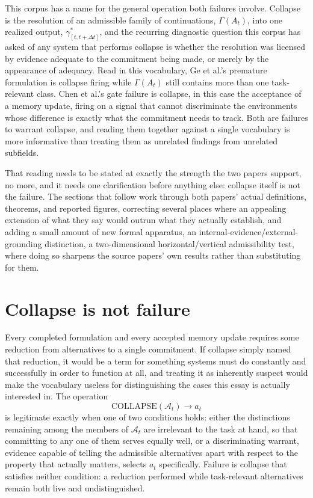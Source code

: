 \documentclass[11pt]{article}
\begin{document}
This corpus has a name for the general operation both failures involve. Collapse is the resolution of an admissible family of continuations, $\Gamma(A_t)$, into one realized output, $\gamma^*_{[t,t+\Delta t]}$, and the recurring diagnostic question this corpus has asked of any system that performs collapse is whether the resolution was licensed by evidence adequate to the commitment being made, or merely by the appearance of adequacy. Read in this vocabulary, Ge et al.'s premature formulation is collapse firing while $\Gamma(A_t)$ still contains more than one task-relevant class. Chen et al.'s gate failure is collapse, in this case the acceptance of a memory update, firing on a signal that cannot discriminate the environments whose difference is exactly what the commitment needs to track. Both are failures to warrant collapse, and reading them together against a single vocabulary is more informative than treating them as unrelated findings from unrelated subfields.

That reading needs to be stated at exactly the strength the two papers support, no more, and it needs one clarification before anything else: collapse itself is not the failure. The sections that follow work through both papers' actual definitions, theorems, and reported figures, correcting several places where an appealing extension of what they say would outrun what they actually establish, and adding a small amount of new formal apparatus, an internal-evidence/external-grounding distinction, a two-dimensional horizontal/vertical admissibility test, where doing so sharpens the source papers' own results rather than substituting for them.

\section{Collapse is not failure}

Every completed formulation and every accepted memory update requires some reduction from alternatives to a single commitment. If collapse simply named that reduction, it would be a term for something systems must do constantly and successfully in order to function at all, and treating it as inherently suspect would make the vocabulary useless for distinguishing the cases this essay is actually interested in. The operation
$$\text{COLLAPSE}(\mathcal{A}_t) \to a_t$$
is legitimate exactly when one of two conditions holds: either the distinctions remaining among the members of $\mathcal{A}_t$ are irrelevant to the task at hand, so that committing to any one of them serves equally well, or a discriminating warrant, evidence capable of telling the admissible alternatives apart with respect to the property that actually matters, selects $a_t$ specifically. Failure is collapse that satisfies neither condition: a reduction performed while task-relevant alternatives remain both live and undistinguished.
\end{document}
